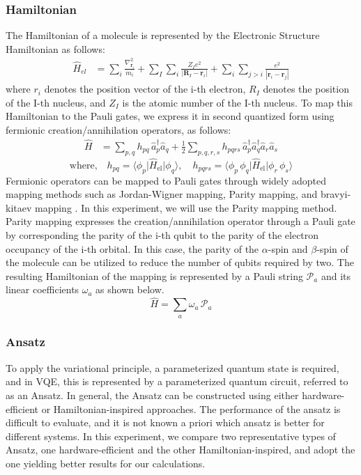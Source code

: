 \documentclass[pdflatex,sn-mathphys-num]{sn-jnl}%
\theoremstyle{thmstyleone}%
\theoremstyle{thmstyletwo}%
\theoremstyle{thmstylethree}%
\begin{document}
\subsubsection{Hamiltonian}\label{subsec2.2.1}
The Hamiltonian of a molecule is represented by the Electronic Structure Hamiltonian as follows:
\begin{align}
\hat{H}_{el} 
&= \sum_{i} \frac{\nabla_{\mathbf{r}_i}^2}{m_i}
+ \sum_{I} \sum_{i} \frac{Z_I e^2}{\left| \mathbf{R}_I - \mathbf{r}_i \right|}
+ \sum_{i} \sum_{j>i} \frac{e^2}{\left| \mathbf{r}_i - \mathbf{r}_j \right|}
\end{align}
where \(r_i\) denotes the position vector of the i-th electron, \(R_I\) denotes the position of the I-th nucleus, and \(Z_I\) is the atomic number of the I-th nucleus. To map this Hamiltonian to the Pauli gates, we express it in second quantized form using fermionic creation/annihilation operators\cite{2NDQ1,2NDQ2,2NDQ3}, as follows:
\begin{align}
\hat{H} 
&= \sum_{p,q} h_{pq} \, \hat{a}_p^{\dagger} \hat{a}_q
+ \frac{1}{2} \sum_{p,q,r,s} h_{pqrs} \, \hat{a}_p^{\dagger} \hat{a}_q^{\dagger} \hat{a}_r \hat{a}_s
\end{align}
\begin{equation*}
\text{where,} \quad 
h_{pq} = \langle \phi_p \vert \hat{H}_{\mathrm{el}} \vert \phi_q \rangle, \quad
h_{pqrs} = \langle \phi_p \, \phi_q \vert \hat{H}_{\mathrm{el}} \vert \phi_r \, \phi_s \rangle
\end{equation*}
Fermionic operators can be mapped to Pauli gates through widely adopted mapping methods such as Jordan-Wigner mapping, Parity mapping, and bravyi-kitaev mapping \cite{MAP1,MAP2}. In this experiment, we will use the Parity mapping method. Parity mapping expresses the creation/annihilation operator through a Pauli gate by corresponding the parity of the i-th qubit to the parity of the electron occupancy of the i-th orbital. In this case, the parity of the \(\alpha\)-spin and \(\beta\)-spin of the molecule can be utilized to reduce the number of qubits required by two. The resulting Hamiltonian of the mapping is represented by a Pauli string \(\mathcal{P}_{a}\) and its linear coefficients \(\omega_a\) as shown below.
\begin{equation}
\hat{H} = \sum_{a} \omega_{a} \, \mathcal{P}_{a}
\end{equation}

\subsubsection{Ansatz}\label{subsec2.2.2}
To apply the variational principle, a parameterized quantum state is required, and in VQE, this is represented by a parameterized quantum circuit, referred to as an Ansatz. In general, the Ansatz can be constructed using either hardware-efficient or Hamiltonian-inspired approaches. The performance of the ansatz is difficult to evaluate, and it is not known a priori which ansatz is better for different systems. In this experiment, we compare two representative types of Ansatz, one hardware-efficient and the other Hamiltonian-inspired, and adopt the one yielding better results for our calculations.
\end{document}
